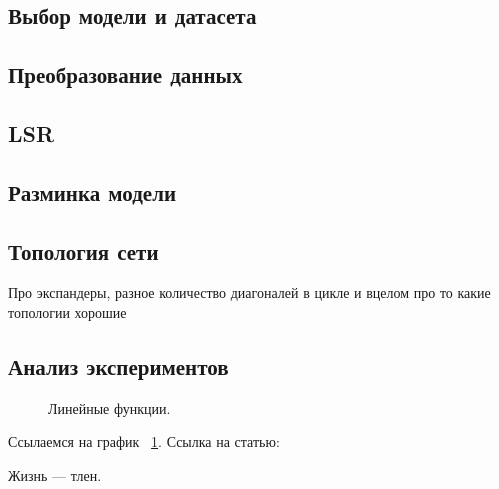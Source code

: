 \documentclass[a4paper,article,14pt]{extarticle}
\begin{document}
\subsection{Выбор модели и датасета}
\subsection{Преобразование данных}
\subsection{LSR}
\subsection{Разминка модели}
\subsection{Топология сети}
Про экспандеры, разное количество диагоналей в цикле и вцелом про то какие топологии хорошие

\subsection{Анализ экспериментов}
\begin{figure}[ht]
\begin{center}

\caption{
\label{graph-fig}
     Линейные функции.}
\end {center}
\end {figure}
Ссылаемся на график ~\ref{graph-fig}.
Ссылка на статью: \cite{mbgd}

Жизнь --- тлен.
\pagebreak
\end{document}
